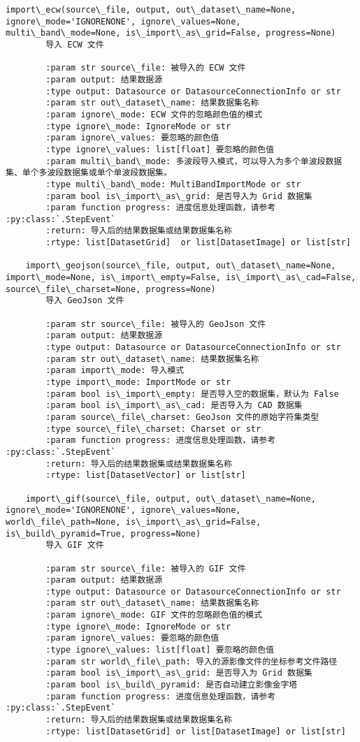 \documentclass[11pt]{article}
\begin{document}
\begin{Verbatim}[commandchars=\\\{\}]
    import\_ecw(source\_file, output, out\_dataset\_name=None, ignore\_mode='IGNORENONE', ignore\_values=None, multi\_band\_mode=None, is\_import\_as\_grid=False, progress=None)
        导入 ECW 文件
        
        :param str source\_file: 被导入的 ECW 文件
        :param output: 结果数据源
        :type output: Datasource or DatasourceConnectionInfo or str
        :param str out\_dataset\_name: 结果数据集名称
        :param ignore\_mode: ECW 文件的忽略颜色值的模式
        :type ignore\_mode: IgnoreMode or str
        :param ignore\_values: 要忽略的颜色值
        :type ignore\_values: list[float] 要忽略的颜色值
        :param multi\_band\_mode: 多波段导入模式，可以导入为多个单波段数据集、单个多波段数据集或单个单波段数据集。
        :type multi\_band\_mode: MultiBandImportMode or str
        :param bool is\_import\_as\_grid: 是否导入为 Grid 数据集
        :param function progress: 进度信息处理函数，请参考 :py:class:`.StepEvent`
        :return: 导入后的结果数据集或结果数据集名称
        :rtype: list[DatasetGrid]  or list[DatasetImage] or list[str]
    
    import\_geojson(source\_file, output, out\_dataset\_name=None, import\_mode=None, is\_import\_empty=False, is\_import\_as\_cad=False, source\_file\_charset=None, progress=None)
        导入 GeoJson 文件
        
        :param str source\_file: 被导入的 GeoJson 文件
        :param output: 结果数据源
        :type output: Datasource or DatasourceConnectionInfo or str
        :param str out\_dataset\_name: 结果数据集名称
        :param import\_mode: 导入模式
        :type import\_mode: ImportMode or str
        :param bool is\_import\_empty: 是否导入空的数据集，默认为 False
        :param bool is\_import\_as\_cad: 是否导入为 CAD 数据集
        :param source\_file\_charset: GeoJson 文件的原始字符集类型
        :type source\_file\_charset: Charset or str
        :param function progress: 进度信息处理函数，请参考 :py:class:`.StepEvent`
        :return: 导入后的结果数据集或结果数据集名称
        :rtype: list[DatasetVector] or list[str]
    
    import\_gif(source\_file, output, out\_dataset\_name=None, ignore\_mode='IGNORENONE', ignore\_values=None, world\_file\_path=None, is\_import\_as\_grid=False, is\_build\_pyramid=True, progress=None)
        导入 GIF 文件
        
        :param str source\_file: 被导入的 GIF 文件
        :param output: 结果数据源
        :type output: Datasource or DatasourceConnectionInfo or str
        :param str out\_dataset\_name: 结果数据集名称
        :param ignore\_mode: GIF 文件的忽略颜色值的模式
        :type ignore\_mode: IgnoreMode or str
        :param ignore\_values: 要忽略的颜色值
        :type ignore\_values: list[float] 要忽略的颜色值
        :param str world\_file\_path: 导入的源影像文件的坐标参考文件路径
        :param bool is\_import\_as\_grid: 是否导入为 Grid 数据集
        :param bool is\_build\_pyramid: 是否自动建立影像金字塔
        :param function progress: 进度信息处理函数，请参考 :py:class:`.StepEvent`
        :return: 导入后的结果数据集或结果数据集名称
        :rtype: list[DatasetGrid] or list[DatasetImage] or list[str]
    

\end{Verbatim}
\end{document}
